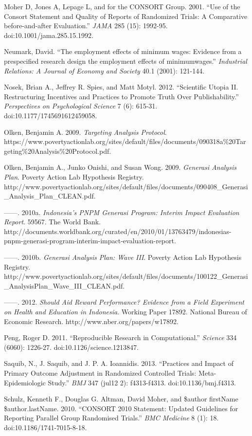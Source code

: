 \documentclass[12pt] {article}
\begin{document}
Moher D, Jones A, Lepage L, and for the CONSORT Group. 2001. ``Use of
the Consort Statement and Quality of Reports of Randomized Trials: A
Comparative before-and-after Evaluation.'' \emph{JAMA} 285 (15):
1992-95. doi:10.1001/jama.285.15.1992.

Neumark, David. ``The employment effects of minimum wages: Evidence from
a prespecified research design the employment effects of minimumwages.''
\emph{Industrial Relations: A Journal of Economy and Society} 40.1
(2001): 121-144.

Nosek, Brian A., Jeffrey R. Spies, and Matt Motyl. 2012. ``Scientific
Utopia II. Restructuring Incentives and Practices to Promote Truth Over
Publishability.'' \emph{Perspectives on Psychological Science} 7 (6):
615-31. doi:10.1177/1745691612459058.

Olken, Benjamin A. 2009. \emph{Targeting Analysis Protocol}.
https://www.povertyactionlab.org/sites/default/files/documents/090318a\%20Targeting\%20Analysis\%20Protocol.pdf.

Olken, Benjamin A., Junko Onishi, and Susan Wong. 2009. \emph{Generasi
Analysis Plan}. Poverty Action Lab Hypothesis Registry.
http://www.povertyactionlab.org/sites/default/files/documents/090408\_Generasi\_Analysis\_Plan\_CLEAN.pdf.

------. 2010a. \emph{Indonesia's PNPM Generasi Program: Interim Impact
Evaluation Report}. 59567. The World Bank.
http://documents.worldbank.org/curated/en/2010/01/13763479/indonesias-pnpm-generasi-program-interim-impact-evaluation-report.

------. 2010b. \emph{Generasi Analysis Plan: Wave III}. Poverty Action
Lab Hypothesis Registry.
http://www.povertyactionlab.org/sites/default/files/documents/100122\_Generasi\_AnalysisPlan\_Wave\_III\_CLEAN.pdf.

------. 2012. \emph{Should Aid Reward Performance? Evidence from a Field
Experiment on Health and Education in Indonesia}. Working Paper 17892.
National Bureau of Economic Research. http://www.nber.org/papers/w17892.

Peng, Roger D. 2011. ``Reproducible Research in Computational.''
\emph{Science} 334 (6060): 1226-27. doi:10.1126/science.1213847.

Saquib, N., J. Saquib, and J. P. A. Ioannidis. 2013. ``Practices and
Impact of Primary Outcome Adjustment in Randomized Controlled Trials:
Meta-Epidemiologic Study.'' \emph{BMJ} 347 (jul12 2): f4313-f4313.
doi:10.1136/bmj.f4313.

Schulz, Kenneth F., Douglas G. Altman, David Moher, and \$author
firstName \$author.lastName. 2010. ``CONSORT 2010 Statement: Updated
Guidelines for Reporting Parallel Group Randomised Trials.'' \emph{BMC
Medicine} 8 (1): 18. doi:10.1186/1741-7015-8-18.
\end{document}
